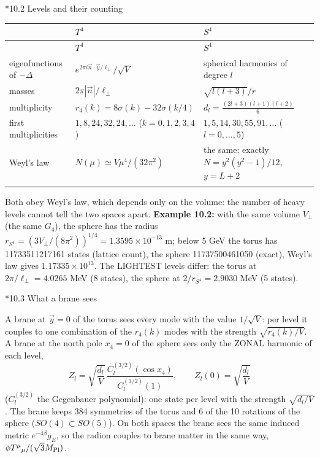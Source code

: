 \documentclass[10pt,a4paper]{article}
\makeatletter
\renewcommand\subsection{\@startsection{subsection}{2}{\z@}{-3.25ex\@plus -1ex \@minus -.2ex}{1.5ex \@plus .2ex}{\normalfont\large\bfseries\raggedright}}
\makeatother
\begin{document}
\subsection*{10.2 Levels and their counting}
{\footnotesize
\begin{longtable}{>{\raggedright\arraybackslash}p{}>{\raggedright\arraybackslash}p{}>{\raggedright\arraybackslash}p{}}
\toprule
\textbf{} & \textbf{$T^4$} & \textbf{$S^4$} \\
\midrule\endfirsthead
\toprule
\textbf{} & \textbf{$T^4$} & \textbf{$S^4$} \\
\midrule\endhead
\endfoot
\bottomrule\endlastfoot
eigenfunctions of $-\Delta$ & $e^{2\pi i\vec n\cdot\vec y/\ell_\perp}/\sqrt V$ & spherical harmonics of degree $l$ \\
masses & $2\pi|\vec n|/\ell_\perp$ & $\sqrt{l(l+3)}/r$ \\
multiplicity & $r_4(k)=8\sigma(k)-32\sigma(k/4)$ & $d_l=\frac{(2l+3)(l+1)(l+2)}6$ \\
first multiplicities & $1,8,24,32,24,\dots$ ($k=0,1,2,3,4$) & $1,5,14,30,55,91,\dots$ ($l=0,\dots,5$) \\
Weyl’s law & $N(\mu)\simeq V\mu^4/(32\pi^2)$ & the same; exactly $N=y^2(y^2-1)/12$, $y=L+2$ \\*
\end{longtable}}
Both obey Weyl’s law, which depends only on the volume: the number of heavy levels cannot tell the two spaces apart. \textbf{Example 10.2:} with the same volume $V_\perp$ (the same $G_4$), the sphere has the radius $r_{S^4}=(3V_\perp/(8\pi^2))^{1/4}=1.3595\times10^{-13}$ m; below 5 GeV the torus has 11733511217161 states (lattice count), the sphere 11737500461050 (exact), Weyl’s law gives $1.17335\times10^{13}$. The LIGHTEST levels differ: the torus at $2\pi/\ell_\perp=4.0265$ MeV (8 states), the sphere at $2/r_{S^4}=2.9030$ MeV (5 states).

\subsection*{10.3 What a brane sees}
A brane at $\vec y=0$ of the torus sees every mode with the value $1/\sqrt V$: per level it couples to one combination of the $r_4(k)$ modes with the strength $\sqrt{r_4(k)/V}$. A brane at the north pole $x_4=0$ of the sphere sees only the ZONAL harmonic of each level,
\begin{equation*}
Z_l=\sqrt{\frac{d_l}V}\,\frac{C_l^{(3/2)}(\cos x_4)}{C_l^{(3/2)}(1)},\qquad Z_l(0)=\sqrt{\frac{d_l}V}
\end{equation*}
($C_l^{(3/2)}$ the Gegenbauer polynomial): one state per level with the strength $\sqrt{d_l/V}$. The brane keeps 384 symmetries of the torus and 6 of the 10 rotations of the sphere ($SO(4)\subset SO(5)$). On both spaces the brane sees the same induced metric $e^{-4\beta}g_E$, so the radion couples to brane matter in the same way, $\phi T^\mu{}_\mu/(\sqrt3M_{\rm Pl})$.
\end{document}
